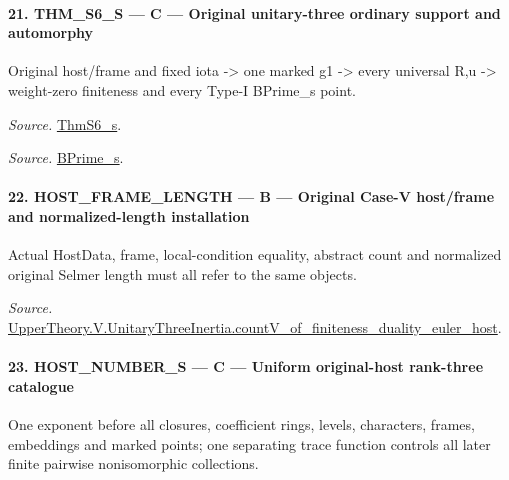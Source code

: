 \documentclass[11pt,a4paper]{article}
\numberwithin{equation}{section}
\theoremstyle{remark}\newtheorem{remark}[theorem]{Remark}
\begin{document}
\paragraph{21. THM\_\allowbreak S6\_\allowbreak S — C — Original unitary-three ordinary support and automorphy}

Original host/frame and fixed iota -> one marked g1 -> every universal R,u -> weight-zero finiteness and every Type-I BPrime\_\allowbreak s point.

\emph{Source.} \href{https://github.com/CocoSgt/riemann-hypothesis-lean/blob/7cbf7a0c32fca1badf05931879a37c3f8a2b03b4/src/Development/AutomorphicArithmetic/AutomorphicVarieties/ModularityArgument/ThresholdArguments/DenseThresholdCases/ThmS6CoreS.lean#L17-L26}{ThmS6\_\allowbreak s}.

\emph{Source.} \href{https://github.com/CocoSgt/riemann-hypothesis-lean/blob/7cbf7a0c32fca1badf05931879a37c3f8a2b03b4/src/Development/AutomorphicArithmetic/AutomorphicVarieties/ModularityArgument/ThresholdArguments/DenseThresholdCases/ThmS6CoreS.lean#L12-L16}{BPrime\_\allowbreak s}.



\paragraph{22. HOST\_\allowbreak FRAME\_\allowbreak LENGTH — B — Original Case-V host/frame and normalized-length installation}

Actual HostData, frame, local-condition equality, abstract count and normalized original Selmer length must all refer to the same objects.

\emph{Source.} \href{https://github.com/CocoSgt/riemann-hypothesis-lean/blob/7cbf7a0c32fca1badf05931879a37c3f8a2b03b4/src/Development/AutomorphicArithmetic/AutomorphicVarieties/ModularityArgument/ThresholdArguments/DenseThresholdCases/CountVOf.lean#L33-L60}{UpperTheory.V.UnitaryThreeInertia.countV\_\allowbreak of\_\allowbreak finiteness\_\allowbreak duality\_\allowbreak euler\_\allowbreak host}.



\paragraph{23. HOST\_\allowbreak NUMBER\_\allowbreak S — C — Uniform original-host rank-three catalogue}

One exponent before all closures, coefficient rings, levels, characters, frames, embeddings and marked points; one separating trace function controls all later finite pairwise nonisomorphic collections.
\end{document}
